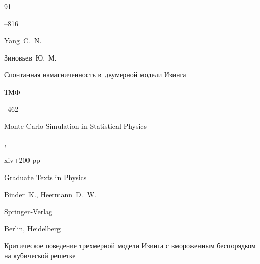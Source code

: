 \begin{thebibliography}{91}


--816

\by Yang~C.~N.





\by Зиновьев~Ю.~М.

\paper Спонтанная намагниченность в~двумерной модели Изинга

\jour ТМФ




--462
















\book Monte Carlo Simulation in Statistical Physics

, 


xiv+200 pp

\serial Graduate Texts in Physics

\by Binder~K., Heermann~D.~W.


\publ Springer-Verlag 

\publaddr Berlin, Heidelberg 




\paper Критическое поведение трехмерной модели Изинга с вмороженным беспорядком на кубической решетке


\end{thebibliography}
